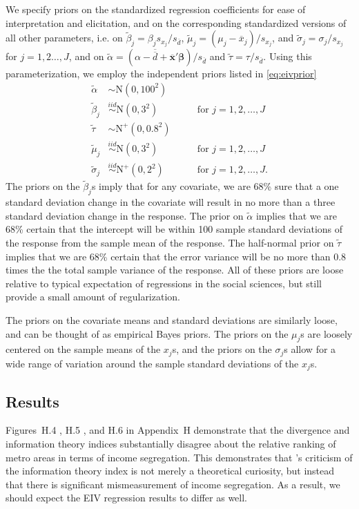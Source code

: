 \documentclass[12pt]{article}
\begin{document}
We specify priors on the standardized regression coefficients for ease of interpretation and elicitation, and on the corresponding standardized versions of all other parameters, i.e. on $\widetilde{\beta}_j = \beta_j s_{x_j} / s_{\overline{d}}$, $\widetilde{\mu}_j = (\mu_j - \overline{x}_j)/s_{x_j}$, and $\widetilde{\sigma}_j = \sigma_j / s_{x_j}$ for $j=1,2\dots,J$, and on $\widetilde{\alpha} = (\alpha - \overline{\overline{d}} + \overline{\bm{x}}'\bm{\beta}) / s_{\overline{d}}$ and $\widetilde{\tau} = \tau / s_{\overline{d}}$. Using this parameterization, we employ the independent priors listed in \eqref{eq:eivprior} 
\begin{align}
  \widetilde{\alpha} &\sim \mathrm{N}(0, 100^2) &&& \nonumber\\
  \widetilde{\beta}_j &\stackrel{iid}{\sim} \mathrm{N}(0, 3^2) &&& \mbox{ for } j=1,2,\dots,J \nonumber\\
  \widetilde{\tau} & \sim \mathrm{N}^+(0, 0.8^2) &&&\nonumber\\
  \widetilde{\mu}_j & \stackrel{iid}{\sim} \mathrm{N}(0, 3^2) &&& \mbox{ for } j=1,2,\dots,J\nonumber\\
  \widetilde{\sigma}_j & \stackrel{iid}{\sim} \mathrm{N}^+(0, 2^2) &&& \mbox{ for } j=1,2,\dots,J. \label{eq:eivprior}
\end{align}
The priors on the $\widetilde{\beta}_j$s imply that for any covariate, we are 68\% sure that a one standard deviation change in the covariate will result in no more than a three standard deviation change in the response. The prior on $\widetilde{\alpha}$ implies that we are 68\% certain that the intercept will be within 100 sample standard deviations of the response from the sample mean of the response. The half-normal prior on $\widetilde{\tau}$ implies that we are 68\% certain that the error variance will be no more than $0.8$ times the the total sample variance of the response. All of these priors are loose relative to typical expectation of regressions in the social sciences, but still provide a small amount of regularization.

The priors on the covariate means and standard deviations are similarly loose, and can be thought of as empirical Bayes priors. The priors on the $\mu_j$s are loosely centered on the sample means of the $x_j$s, and the priors on the $\sigma_j$s allow for a wide range of variation around the sample standard deviations of the $x_j$s.

\subsection{Results}\label{sec:results}
Figures~H.4 %
 , H.5 %
 , and H.6 %
 in Appendix~H %
 demonstrate that the divergence and information theory indices substantially disagree about the relative ranking of metro areas in terms of income segregation. This demonstrates that \citet{roberto2015divergence}'s criticism of the information theory index is not merely a theoretical curiosity, but instead that there is significant mismeasurement of income segregation. As a result, we should expect the EIV regression results to differ as well.
\end{document}
